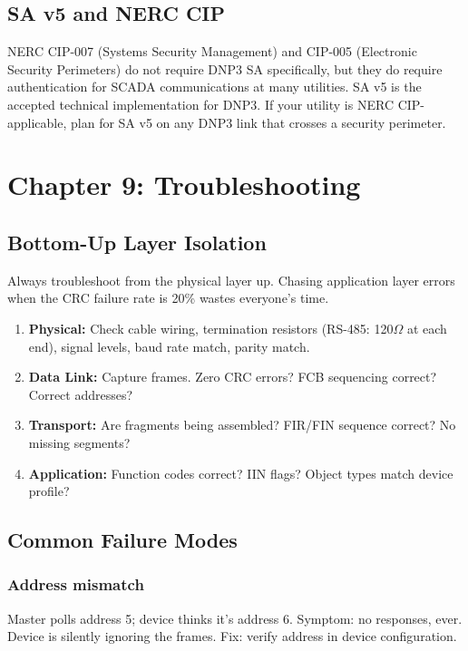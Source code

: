 \documentclass[11pt,twoside]{article}
\begin{document}
\subsection{SA v5 and NERC CIP}

NERC CIP-007 (Systems Security Management) and CIP-005 (Electronic Security Perimeters) do not require DNP3 SA specifically, but they do require authentication for SCADA communications at many utilities. SA v5 is the accepted technical implementation for DNP3. If your utility is NERC CIP-applicable, plan for SA v5 on any DNP3 link that crosses a security perimeter.

\section{Chapter 9: Troubleshooting}

\subsection{Bottom-Up Layer Isolation}

Always troubleshoot from the physical layer up. Chasing application layer errors when the CRC failure rate is 20\% wastes everyone's time.

\begin{enumerate}
  \item \textbf{Physical:} Check cable wiring, termination resistors (RS-485: 120$\Omega$ at each end), signal levels, baud rate match, parity match.
  \item \textbf{Data Link:} Capture frames. Zero CRC errors? FCB sequencing correct? Correct addresses?
  \item \textbf{Transport:} Are fragments being assembled? FIR/FIN sequence correct? No missing segments?
  \item \textbf{Application:} Function codes correct? IIN flags? Object types match device profile?
\end{enumerate}

\subsection{Common Failure Modes}

\subsubsection{Address mismatch}
Master polls address 5; device thinks it's address 6. Symptom: no responses, ever. Device is silently ignoring the frames. Fix: verify address in device configuration.
\end{document}
